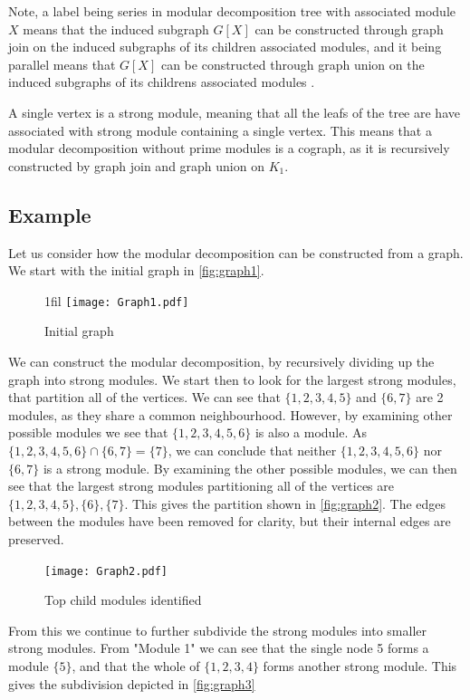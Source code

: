 \documentclass[a4paper]{article}
\makeatletter
\newcommand*{\centerfloat}{%
  \parindent \z@
  \leftskip \z@ \@plus 1fil \@minus \textwidth
  \rightskip\leftskip
  \parfillskip \z@skip}
\makeatother
\begin{document}
Note, a label being series in modular decomposition tree with associated module
$X$ means that the induced subgraph $G[X]$ can be constructed through graph
join on the induced subgraphs of its children associated modules, and it being
parallel means that $G[X]$ can be constructed through graph union on the
induced subgraphs of its childrens associated modules \cite{HCL}.

A single vertex is a strong module, meaning that all the leafs of the tree are
have associated  with strong module containing a single vertex. This means that
a modular decomposition without prime modules is a cograph, as it is
recursively constructed by graph join and graph union on $K_1$.


\subsection{Example}

Let us consider how the modular decomposition can be constructed from a graph. 
We start with the initial graph in \autoref{fig:graph1}.


\newcommand{\figbase}{0.6\textwidth}


\begin{figure}[H]
    \centerfloat
    \texttt{[image: Graph1.pdf]}
    \caption{Initial graph}
    \label{fig:graph1}
\end{figure}

We can construct the modular decomposition, by recursively dividing up the graph
into strong modules. We start then to look for the largest strong modules, that
partition all of the vertices. We can see that $\{1,2,3,4,5\}$ and $\{6,7\}$ are
2 modules, as they share a common neighbourhood.  However, by examining other
possible modules we see that $\{1,2,3,4,5,6\}$ is also a module. As 
$\{1,2,3,4,5,6\} \cap \{6,7\} = \{7\}$, we can conclude that neither 
$\{1,2,3,4,5,6\}$ nor $\{6,7\}$ is a strong module. By examining the other
possible modules, we can then see that the largest strong modules partitioning all of 
the vertices are $\{1,2,3,4,5\},\{6\},\{7\}$. This gives
the partition shown in \autoref{fig:graph2}. The edges between the modules have
been removed for clarity, but their internal edges are preserved.

\begin{figure}[H]
    \texttt{[image: Graph2.pdf]}
    \caption{Top child modules identified}
    \label{fig:graph2}
\end{figure}

From this we continue to further subdivide the strong modules into smaller
strong modules. From "Module 1" we can see that the single node 5 forms a
module $\{5\}$, and that the whole of $\{1,2,3,4\}$ forms another strong module.  This
gives the subdivision depicted in \autoref{fig:graph3}
\end{document}
